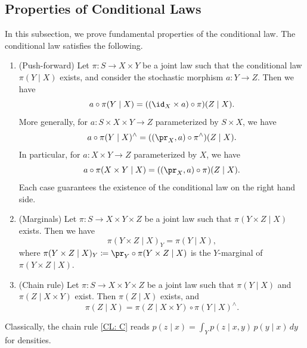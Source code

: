 \documentclass[12pt,reqno]{amsart}%
\theoremstyle{plain}
\theoremstyle{definition}
\begin{document}
%
\subsection{Properties of Conditional Laws}
%

In this subsection, we prove fundamental properties of the conditional law.
The conditional law satisfies the following.

\begin{lemma}\label{lem: properties}
	\begin{enumerate}[label=(\alph*)]
		\item\label{CL: P} (Push-forward)
		Let $\pi\colon S\rightarrow X\times Y$
		be a joint law such that the conditional law  $\pi(Y\mid X)$ exists,
		and consider the stochastic morphism $a\colon Y\rightarrow Z$.
		Then we have
		\[
			a\circ\pi(Y\mid X)=((\id_X\times a)\circ\pi)(Z\mid X).
		\]
		More generally, for $a\colon S\times X\times Y\rightarrow Z$ 
		parameterized by $S\times X$, we have
		\[
			a\circ\pi(Y\mid X)^\wedge=((\pr_X,a)\circ\pi^\wedge)(Z\mid X).
		\]
		In particular, for $a\colon X\times Y\rightarrow Z$ parameterized by $X$, we have
		\[
			a\circ\pi(X\times Y\mid X)=((\pr_X,a)\circ\pi)(Z\mid X).
		\]
		Each case guarantees the existence of the conditional law on the right hand side.
		\item\label{CL: M} (Marginals)
		Let $\pi\colon S\rightarrow X\times Y\times Z$ be a joint law such 
		that $\pi(Y\times Z\mid X)$ exists.
		Then we have
		\[
			\pi(Y\times Z\mid X)_Y=\pi(Y\mid X),
		\]
		where
		$\pi(Y\times Z\mid X)_Y\coloneqq\pr_Y\circ\pi(Y\times Z\mid X)$ is the $Y$-marginal of
		$\pi(Y\times Z\mid X)$.
		\item\label{CL: C} (Chain rule)
		Let $\pi\colon S\rightarrow X\times Y\times Z$ be a joint law such that
		$\pi(Y\mid X)$ and $\pi(Z\mid X\times Y)$ exist.  Then $\pi(Z\mid X)$ exists, and
		\[
			\pi(Z\mid X)=\pi(Z\mid X\times Y)\circ\pi(Y\mid X)^\wedge.
		\]
	\end{enumerate}
\end{lemma}

Classically, the chain rule \ref{CL: C} reads $p(z\mid x)=\int_Y p(z\mid x,y)\,p(y\mid x)\,dy$ for densities.
\end{document}
